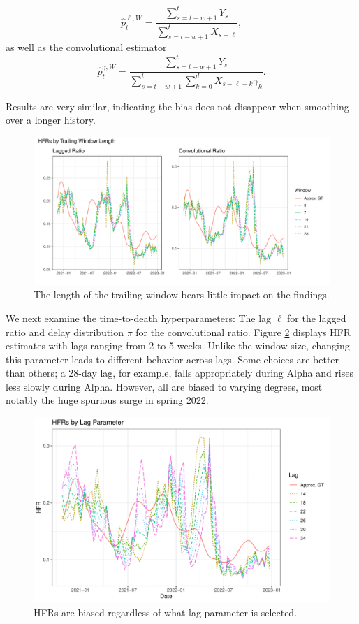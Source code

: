 \documentclass{article}
\begin{document}
\begin{equation}\label{eq:laggedSmooth}
    \hat{p}_t^{\ell, W} = \frac{\sum_{s=t-w+1}^{t} Y_s}{\sum_{s=t-w+1}^{t} X_{s-\ell}},
\end{equation}
\noindent as well as the convolutional estimator
\begin{equation}\label{eq:convSmooth}
    \hat{p}_t^{\gamma, W} = \frac{\sum_{s=t-w+1}^{t} Y_s}{\sum_{s=t-w+1}^{t} \sum_{k=0}^d X_{s-\ell-k}\gamma_k}.
\end{equation}

\noindent Results are very similar, indicating the bias does not disappear when smoothing over a longer history. 

\begin{figure}
    \centering
    \includegraphics[width=0.75\linewidth]{Figs/Real/window_size.pdf}
    \caption{The length of the trailing window bears little impact on the findings.}
    \label{fig:window}
\end{figure}

We next examine the time-to-death hyperparameters: The lag $\ell$ for the lagged ratio and delay distribution $\pi$ for the convolutional ratio. Figure \ref{fig:lag} displays HFR estimates with lags ranging from 2 to 5 weeks. Unlike the window size, changing this parameter leads to different behavior across lags. Some choices are better than others; a 28-day lag, for example, falls appropriately during Alpha and rises less slowly during Alpha. However, all are biased to varying degrees, most notably the huge spurious surge in spring 2022.

\begin{figure}
    \centering
    \includegraphics[width=0.7\linewidth]{Figs/Real/hfrs_by_lag.pdf}
    \caption{HFRs are biased regardless of what lag parameter is selected.}
    \label{fig:lag}
\end{figure}
\end{document}
